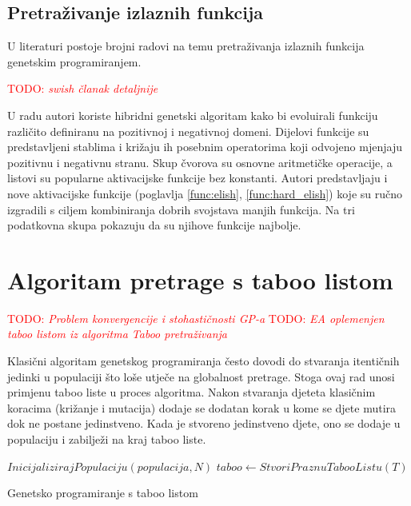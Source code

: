 \documentclass[times, utf8, numeric, diplomski]{fer}
\def\TODO#1{\noindent\textcolor{red}{TODO: \textit{#1}}\newline}
\def\todo#1{\TODO{#1}}
\begin{document}
\subsection{Pretraživanje izlaznih funkcija}
U literaturi postoje brojni radovi na temu pretraživanja izlaznih funkcija genetskim programiranjem.

\todo{swish članak detaljnije \citep{swish}}

U radu \citet{elish} autori koriste hibridni genetski algoritam kako bi evoluirali funkciju različito definiranu na pozitivnoj i negativnoj domeni. Dijelovi funkcije su predstavljeni stablima i križaju ih posebnim operatorima koji odvojeno mjenjaju pozitivnu i negativnu stranu. Skup čvorova su osnovne aritmetičke operacije, a listovi su popularne aktivacijske funkcije bez konstanti. Autori predstavljaju i nove aktivacijske funkcije (poglavlja \ref{func:elish}, \ref{func:hard_elish}) koje su ručno izgradili s ciljem kombiniranja dobrih svojstava manjih funkcija. Na tri podatkovna skupa pokazuju da su njihove funkcije najbolje.

\section{Algoritam pretrage s taboo listom}
\todo{Problem konvergencije i stohastičnosti GP-a}
\todo{EA oplemenjen taboo listom iz algoritma Taboo pretraživanja}

Klasični algoritam genetskog programiranja često dovodi do stvaranja itentičnih jedinki u populaciji što loše utječe na globalnost pretrage. Stoga ovaj rad unosi primjenu taboo liste u proces algoritma. Nakon stvaranja djeteta klasičnim koracima (križanje i mutacija) dodaje se dodatan korak u kome se djete mutira dok ne postane jedinstveno. Kada je stvoreno jedinstveno djete, ono se dodaje u populaciju i zabilježi na kraj taboo liste.
\newline
\newline
\begin{algorithm}[H]
\DontPrintSemicolon
{}
$InicijalizirajPopulaciju(populacija, N)$ \;
$taboo \gets StvoriPraznuTabooListu(T)$ \;
\;
\caption{Genetsko programiranje s taboo listom}
\label{alg:ea}
\end{algorithm}
\end{document}
